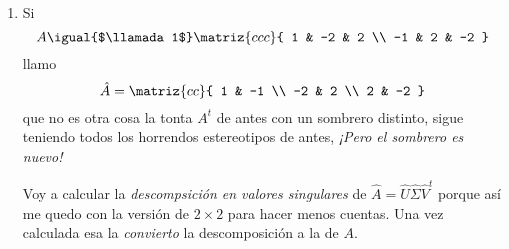 \begin{enumerate}[label=(\alph*)]
  \item
        Si
        $$
          A \igual{$\llamada1$}
          \matriz{ccc}{
            1 & -2 & 2 \\
            -1 & 2 & -2
          }
        $$
        llamo
        $$
          \hat{A} =
          \matriz{cc}{
            1 & -1  \\
            -2 & 2 \\
            2 & -2
          }
        $$
        que no es otra cosa la tonta $A^t$  de antes con un sombrero distinto, sigue teniendo todos los horrendos estereotipos
        de antes, \textit{¡Pero el sombrero es nuevo!}

        Voy a calcular la \textit{descompsición en valores singulares} de $\hat{A} = \hat{U} \hat{\Sigma} \hat{V}^t$ porque así me quedo con la versión de $2 \times 2$ para hacer menos cuentas.
        Una vez calculada esa la \textit{convierto} la descomposición a la de $A$.


\end{enumerate}

